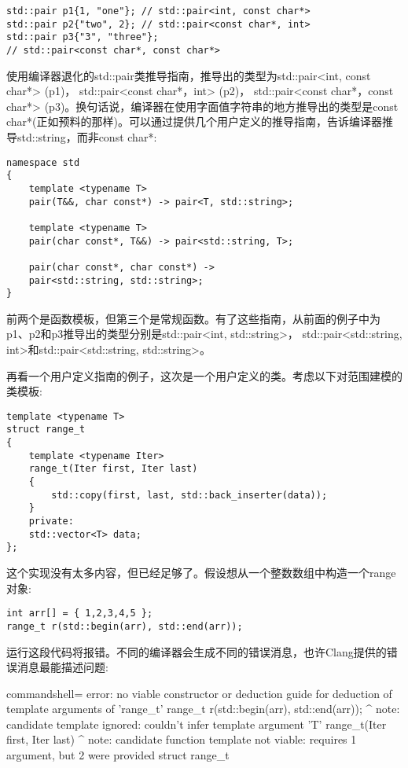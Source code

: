 \begin{lstlisting}[style=styleCXX]
std::pair p1{1, "one"}; // std::pair<int, const char*>
std::pair p2{"two", 2}; // std::pair<const char*, int>
std::pair p3{"3", "three"};
// std::pair<const char*, const char*>
\end{lstlisting}

使用编译器退化的std::pair类推导指南，推导出的类型为std::pair<int, const char*> (p1)， std::pair<const char*，int> (p2)， std::pair<const char*，const char*> (p3)。换句话说，编译器在使用字面值字符串的地方推导出的类型是const char*(正如预料的那样)。可以通过提供几个用户定义的推导指南，告诉编译器推导std::string，而非const char*:

\begin{lstlisting}[style=styleCXX]
namespace std
{
	template <typename T>
	pair(T&&, char const*) -> pair<T, std::string>;
	
	template <typename T>
	pair(char const*, T&&) -> pair<std::string, T>;
	
	pair(char const*, char const*) ->
	pair<std::string, std::string>;
}
\end{lstlisting}

前两个是函数模板，但第三个是常规函数。有了这些指南，从前面的例子中为p1、p2和p3推导出的类型分别是std::pair<int, std::string>， std::pair<std::string, int>和std::pair<std::string, std::string>。

再看一个用户定义指南的例子，这次是一个用户定义的类。考虑以下对范围建模的类模板:

\begin{lstlisting}[style=styleCXX]
template <typename T>
struct range_t
{
	template <typename Iter>
	range_t(Iter first, Iter last)
	{
		std::copy(first, last, std::back_inserter(data));
	}
	private:
	std::vector<T> data;
};
\end{lstlisting}

这个实现没有太多内容，但已经足够了。假设想从一个整数数组中构造一个range对象:

\begin{lstlisting}[style=styleCXX]
int arr[] = { 1,2,3,4,5 };
range_t r(std::begin(arr), std::end(arr));
\end{lstlisting}

运行这段代码将报错。不同的编译器会生成不同的错误消息，也许Clang提供的错误消息最能描述问题:

\begin{tcblisting}{commandshell={}}
error: no viable constructor or deduction guide for deduction
of template arguments of 'range_t'
range_t r(std::begin(arr), std::end(arr));
         ^
note: candidate template ignored: couldn't infer template
argument 'T'
range_t(Iter first, Iter last)
         ^
note: candidate function template not viable: requires 1
argument, but 2 were provided
struct range_t
\end{tcblisting}

